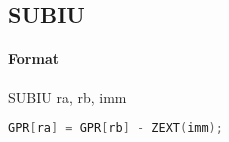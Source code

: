 \subsection{SUBIU}


\paragraph{Format} SUBIU ra, rb, imm

\begin{lstlisting}[language=C]
    GPR[ra] = GPR[rb] - ZEXT(imm);
\end{lstlisting}
